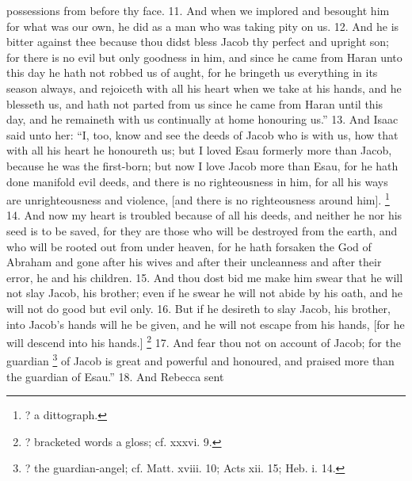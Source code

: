 possessions from before thy face. 11. And when we implored and besought him for what was our own, he did as a man who was taking pity on us. 12. And he is bitter against thee because thou didst bless Jacob thy perfect and upright son; for there is no evil but only goodness in him, and since he came from Haran unto this day he hath not robbed us of aught, for he bringeth us everything in its season always, and rejoiceth with all his heart when we take at his hands, and he blesseth us, and hath not parted from us since he came from Haran until this day, and he remaineth with us continually at home honouring us.'' 13. And Isaac said unto her: ``I, too, know and see the deeds of Jacob who is with us, how that with all his heart he honoureth us; but I loved Esau formerly more than Jacob, because he was the first-born; but now I love Jacob more than Esau, for he hath done manifold evil deeds, and there is no righteousness in him, for all his ways are unrighteousness and violence, [and there is no righteousness around him]. \footnote{? a dittograph.} 14. And now my heart is troubled because of all his deeds, and neither he nor his seed is to be saved, for they are those who will be destroyed from the earth, and who will be rooted out from under heaven, for he hath forsaken the God of Abraham and gone after his wives and after their uncleanness and after their error, he and his children. 15. And thou dost bid me make him swear that he will not slay Jacob, his brother; even if he swear he will not abide by his oath, and he will not do good but evil only. 16. But if he desireth to slay Jacob, his brother, into Jacob's hands will he be given, and he will not escape from his hands, [for he will descend into his hands.] \footnote{? bracketed words a gloss; cf. xxxvi. 9.} 17. And fear thou not on account of Jacob; for the guardian \footnote{? the guardian-angel; cf. Matt. xviii. 10; Acts xii. 15; Heb. i. 14.} of Jacob is great and powerful and honoured, and praised more than the guardian of Esau.'' 18. And Rebecca sent

